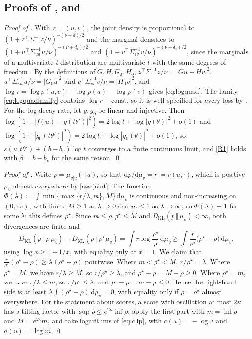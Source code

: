 \documentclass[11pt]{article}
\theoremstyle{plain}
\theoremstyle{definition}
\theoremstyle{remark}
\newcommand{\Dd}{\mathrm{d}}
\newcommand{\define}{\coloneqq}
\newcommand{\KL}[2]{D_{\mathrm{KL}}\!\left(#1\,\Vert\,#2\right)}
\newcommand{\abs}[1]{\left\lvert #1 \right\rvert}
\begin{document}
\subsection{Proofs of \texorpdfstring{}{Proposition 4.16}, \texorpdfstring{}{Proposition 4.17} and \texorpdfstring{}{Corollary 4.18}}
\label{app:logquad}
\emph{Proof of .}
With $z=(u,v)$, the joint density is proportional to
$(1+z^{\top}\Sigma^{-1}z/\nu)^{-(\nu+d)/2}$ and the marginal densities to
$(1+u^{\top}\Sigma_{uu}^{-1}u/\nu)^{-(\nu+d_u)/2}$ and
$(1+v^{\top}\Sigma_{vv}^{-1}v/\nu)^{-(\nu+d_v)/2}$, since the marginals of a
multivariate $t$ distribution are multivariate $t$ with the same degrees of
freedom \cite{kotz2004multivariate}. By the definitions of $G,H,G_0,H_0$,
$z^{\top}\Sigma^{-1}z/\nu=\abs{Gu-Hv}^{2}$,
$u^{\top}\Sigma_{uu}^{-1}u/\nu=\abs{G_0u}^{2}$ and
$v^{\top}\Sigma_{vv}^{-1}v/\nu=\abs{H_0v}^{2}$, and
$\log r=\log p(u,v)-\log p(u)-\log p(v)$ gives \eqref{eq:logquad}. The family
\eqref{eq:logquadfamily} contains $\log r+\mathrm{const}$, so it is
well-specified for every loss by . For the log-decay rate,
let $g,g_0$ be linear and injective. Then
$\log(1+\abs{f(u)-g(t\theta')}^{2})=2\log t+\log\abs{g(\theta)}^{2}+o(1)$ and
$\log(1+\abs{g_0(t\theta')}^{2})=2\log t+\log\abs{g_0(\theta)}^{2}+o(1)$, so
$s(u,t\theta')+(b-b_v)\log t$ converges to a finite continuous limit, and
\ref{R1} holds with $\beta=b-b_v$ for the same reason.
\qed

\smallskip
\noindent\emph{Proof of .}
\label{app:clip}
Write $p=\mu_{v\vert u}(\cdot\vert u)$, so that $\Dd p/\Dd\mu_v=r\define r(u,\cdot)$,
which is positive $\mu_v$-almost everywhere by \ref{ass:joint}.
The function
$\Phi(\lambda)\define\int\min\{\max\{r/\lambda,m\},M\}\,\Dd\mu_v$ is continuous
and non-increasing on $(0,\infty)$, with limits $M\ge1$ as $\lambda\to0$ and
$m\le1$ as $\lambda\to\infty$, so $\Phi(\lambda)=1$ for some $\lambda$; this
defines $\rho^{\star}$. Since $m\le\rho,\rho^{\star}\le M$ and
$\KL{p}{\mu_v}<\infty$, both divergences are finite and
\begin{equation*}
 \KL{p}{\rho\,\mu_v}-\KL{p}{\rho^{\star}\mu_v}
 =\int r\log\frac{\rho^{\star}}{\rho}\,\Dd\mu_v
 \ge\int\frac{r}{\rho^{\star}}\bigl(\rho^{\star}-\rho\bigr)\,\Dd\mu_v,
\end{equation*}
using $\log x\ge1-1/x$, with equality only at $x=1$. We claim that
$\frac{r}{\rho^{\star}}(\rho^{\star}-\rho)\ge\lambda(\rho^{\star}-\rho)$
pointwise. Where $m<\rho^{\star}<M$, $r/\rho^{\star}=\lambda$. Where
$\rho^{\star}=M$, we have $r/\lambda\ge M$, so $r/\rho^{\star}\ge\lambda$,
and $\rho^{\star}-\rho=M-\rho\ge0$. Where $\rho^{\star}=m$, we have
$r/\lambda\le m$, so $r/\rho^{\star}\le\lambda$, and
$\rho^{\star}-\rho=m-\rho\le0$. Hence the right-hand side is at least
$\lambda\int(\rho^{\star}-\rho)\,\Dd\mu_v=0$, with equality only if
$\rho=\rho^{\star}$ almost everywhere. For the statement about scores, a
score with oscillation at most $2\kappa$ has a tilting factor with
$\sup\rho\le e^{2\kappa}\inf\rho$; apply the first part with $m=\inf\rho$
and $M=e^{2\kappa}m$, and take logarithms of \eqref{eq:clip}, with
$c(u)=-\log\lambda$ and $a(u)=\log m$.
\qed
\end{document}
